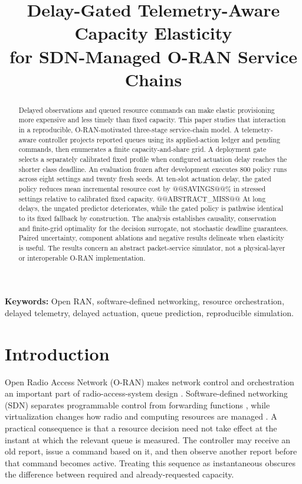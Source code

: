 \documentclass[10pt,a4paper]{article}
\title{Delay-Gated Telemetry-Aware Capacity Elasticity\\for SDN-Managed O-RAN Service Chains}
\author{}
\date{}
\begin{document}
\maketitle
\vspace{-12mm}
\begin{abstract}
Delayed observations and queued resource commands can make elastic provisioning
more expensive and less timely than fixed capacity. This paper studies that
interaction in a reproducible, O-RAN-motivated three-stage service-chain model.
A telemetry-aware controller projects reported queues using its applied-action
ledger and pending commands, then enumerates a finite capacity-and-share grid.
A deployment gate selects a separately calibrated fixed profile when configured
actuation delay reaches the shorter class deadline. An evaluation frozen after
development executes 800 policy runs across eight settings and twenty fresh seeds.
At ten-slot actuation delay, the gated policy reduces mean incremental resource
cost by @@SAVINGS@@\% in stressed settings relative to calibrated fixed capacity.
@@ABSTRACT_MISS@@ At long delays, the ungated predictor deteriorates, while the
gated policy is pathwise identical to its fixed fallback by construction.
The analysis establishes causality, conservation and finite-grid optimality for
the decision surrogate, not stochastic deadline guarantees. Paired uncertainty,
component ablations and negative results delineate when elasticity is useful.
The results concern an abstract packet-service simulator, not a physical-layer
or interoperable O-RAN implementation.
\end{abstract}
\noindent\textbf{Keywords:} Open RAN, software-defined networking, resource orchestration,
delayed telemetry, delayed actuation, queue prediction, reproducible simulation.

\section{Introduction}
Open Radio Access Network (O-RAN) makes network control and orchestration an
important part of radio-access-system design \cite{polese}. Software-defined
networking (SDN) separates programmable control from forwarding functions
\cite{sdn}, while virtualization changes how radio and computing resources are
managed \cite{ecosystem}. A practical consequence is that a resource decision
need not take effect at the instant at which the relevant queue is measured.
The controller may receive an old report, issue a command based on it, and then
observe another report before that command becomes active. Treating this sequence
as instantaneous obscures the difference between required and already-requested
capacity.
\end{document}
